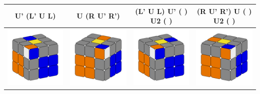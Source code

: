 \documentclass[12pt, a3paper]{article}
\newcommand{\scale}{1}
\begin{document}
\begin{center}
\begin{longtable}{c|c||c|c}
	U' (L' U L) & U (R U' R') & (L' U L) U' ( ) U2 ( ) & (R U' R') U ( ) U2 ( ) \\
	\hline
	\hline
	\includegraphics[scale=\scale]{3l} & \includegraphics[scale=\scale]{3r}  &  \includegraphics[scale=\scale]{4l} & \includegraphics[scale=\scale]{4r} \\

\end{longtable}
\end{center}
\end{document}
